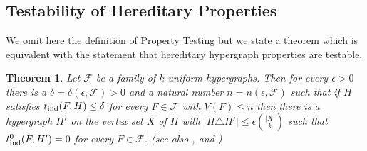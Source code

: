 \documentclass [11pt] {article}
\newtheorem{theorem}{Theorem}
\def\e{\epsilon}
\begin{document}
\subsection{Testability of Hereditary Properties}

We omit here the definition of Property Testing but we state a theorem
 which is equivalent with the statement that hereditary hypergraph properties 
are testable.

\begin{theorem}\label{testable}
 Let $\mathcal{F}$ be a family of $k$-uniform hypergraphs. Then 
for every $\epsilon>0$ there is a $\delta=\delta(\epsilon,\mathcal{F})>0$ and 
a natural number $n=n(\epsilon,\mathcal{F})$ such that if $H$ satisfies 
$t_{\rm ind}(F,H)\leq\delta$ for every $F\in\mathcal{F}$ 
with $V(F)\leq n$ then there is a hypergraph $H'$ on
 the vertex set $X$ of $H$ with 
$|H\triangle H'|\leq\e {{|X|}\choose{k}}$ 
such that $t^0_{\rm ind}(F,H')=0$ for every $F\in\mathcal{F}$.
(see also \cite{RStest},\cite{Austin} and \cite{Austintao})
\end{theorem}
\end{document}
